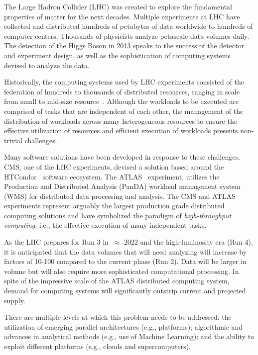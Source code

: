 The Large Hadron Collider (LHC) was created to explore the fundamental
properties of matter for the next decades.   Multiple experiments at LHC have
collected and distributed hundreds of petabytes of data worldwide to hundreds of
computer centers. Thousands of physicists analyze petascale data volumes daily.
The detection of the Higgs Boson in 2013 speaks to the success of the detector
and experiment design, as well as the sophistication of computing systems
devised to analyze the data.

Historically, the computing systems used by LHC experiments consisted of the
federation of hundreds to thousands of distributed resources, %
ranging in scale from small to mid-size resource~\cite{foster2003grid}. Although
the workloads to be executed are comprised of tasks that are independent of each
other, the management of the distribution of workloads across many heterogeneous
resources to ensure the effective utilization of resources and efficient
execution of workloads presents non-trivial challenges.

Many software solutions have been developed in response to these challenges.
CMS, one of the LHC experiments, devised a solution based around the
HTCondor~\cite{thain2005distributed} software ecosystem. The
ATLAS~\cite{Aad:2008} experiment, utilizes the Production and Distributed
Analysis (PanDA) workload management system~\cite{Maeno2011} (WMS) for
distributed data processing and analysis. The CMS and ATLAS experiments
represent arguably the largest production grade distributed computing solutions
and have symbolized the paradigm of {\it high-throughput computing}, i.e., the
effective execution of many independent tasks.

As the LHC prepares for Run 3 in $~\approx$ 2022 and the high-luminosity era
(Run 4), it is anticipated that the data volumes that will need analyzing will
increase by factors of 10-100 compared to the current phase (Run 2). Data will
be larger in volume but will also require more sophisticated computational
processing. In spite of the impressive scale of the ATLAS distributed computing
system, demand for computing systems will significantly outstrip current and projected supply. %

There are multiple levels at which this problem needs to be addressed: the
utilization of emerging parallel architectures (e.g., platforms); algorithmic
and advances in analytical methods (e.g., use of Machine Learning); and the
ability to exploit different platforms (e.g., clouds and supercomputers).

